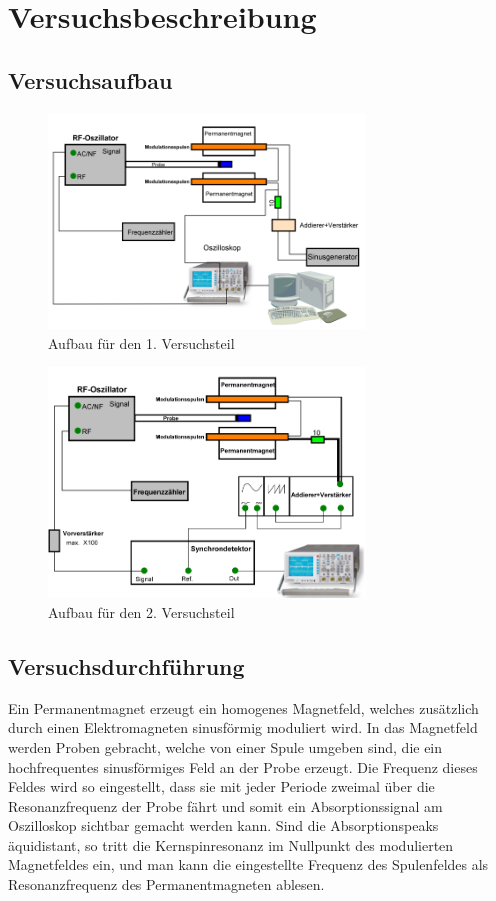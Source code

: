 \section{Versuchsbeschreibung}

\subsection{Versuchsaufbau}

\begin{figure}[H]
\centering \includegraphics[width= 0.75\textwidth]{Bilder/aufbau1.png}
\caption{Aufbau für den 1. Versuchsteil}
\end{figure}

\begin{figure}[H]
\centering \includegraphics[width=0.75\textwidth]{Bilder/aufbau2.png}
\caption{Aufbau für den 2. Versuchsteil}
\end{figure}

\subsection{Versuchsdurchführung}

Ein Permanentmagnet erzeugt ein homogenes Magnetfeld, welches zusätzlich durch einen Elektromagneten sinusförmig moduliert wird. In das Magnetfeld werden Proben gebracht, welche von einer Spule umgeben sind, die ein hochfrequentes sinusförmiges Feld an der Probe erzeugt. Die Frequenz dieses Feldes wird so eingestellt, dass sie mit jeder Periode zweimal über die Resonanzfrequenz der Probe fährt und somit ein Absorptionssignal am Oszilloskop sichtbar gemacht werden kann. Sind die Absorptionspeaks äquidistant, so tritt die Kernspinresonanz im Nullpunkt des modulierten Magnetfeldes ein, und man kann die eingestellte Frequenz des Spulenfeldes als Resonanzfrequenz des Permanentmagneten ablesen.

